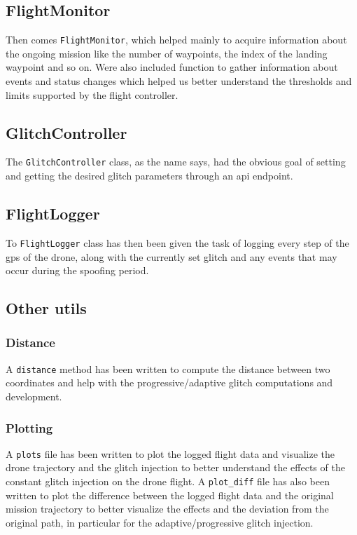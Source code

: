 \subsection{FlightMonitor}
Then comes \texttt{FlightMonitor}, which helped mainly to acquire information about the ongoing mission like the number of waypoints, the index of the landing waypoint and so on.
Were also included function to gather information about events and status changes which helped us better understand the thresholds and limits supported by the flight controller.

\subsection{GlitchController}
The \texttt{GlitchController} class, as the name says, had the obvious goal of setting and getting the desired glitch parameters through an \gls{api} endpoint.

\subsection{FlightLogger}
To \texttt{FlightLogger} class has then been given the task of logging every step of the \gls{gps} of the drone, along with the currently set glitch and any events that may occur during the spoofing period.

\subsection{Other utils}
\subsubsection{Distance}
A \texttt{distance} method has been written to compute the distance between two coordinates and help with the progressive/adaptive glitch computations and development.

\subsubsection{Plotting}
A \texttt{plots} file has been written to plot the logged flight data and visualize the drone trajectory and the glitch injection to better understand the effects of the constant glitch injection on the drone flight.
A \texttt{plot\_diff} file has also been written to plot the difference between the logged flight data and the original mission trajectory to better visualize the effects and the deviation from the original path, in particular for the adaptive/progressive glitch injection.